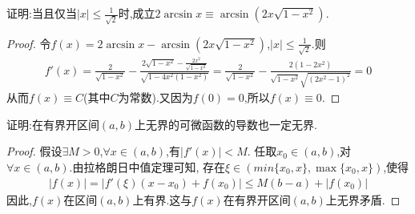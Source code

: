 \documentclass[lang=cn,newtx,10pt,scheme=chinese]{../Template/elegantbook}
\begin{document}
\begin{exercise}
    证明:当且仅当\(\vert x\vert\leqslant \frac{1}{\sqrt{2}}\)时,成立\(2\arcsin x\equiv\arcsin(2x\sqrt{1 - x^{2}})\).
    \begin{proof}
    令$f(x)=2\arcsin x-\arcsin(2x\sqrt{1 - x^{2}})$,\(\vert x\vert\leqslant \frac{1}{\sqrt{2}}\).则
    \begin{equation}
        \begin{split}
            f'\left( x \right) =\frac{2}{\sqrt{1-x^2}}-\frac{2\sqrt{1-x^2}-\frac{2x^2}{\sqrt{1-x^2}}}{\sqrt{1-4x^2\left( 1-x^2 \right)}}
            =\frac{2}{\sqrt{1-x^2}}-\frac{2\left( 1-2x^2 \right)}{\sqrt{1-x^2}\sqrt{\left( 2x^2-1 \right) ^2}}=0
        \end{split}
      \nonumber
    \end{equation}
    从而$f(x)\equiv C$(其中$C$为常数).又因为$f(0)=0$,所以$f(x)\equiv0$.
    
\end{proof}
\end{exercise}


\begin{exercise}
    证明:在有界开区间\((a,b)\)上无界的可微函数的导数也一定无界.
    \begin{proof}
        假设$\exists M>0$,$\forall x\in(a,b)$,有$|f'(x)|<M$.
        任取$x_0\in(a,b)$,对$\forall x\in(a,b)$.由拉格朗日中值定理可知,
        存在$\xi\in(min\{x_0,x\},\max\{x_0,x\})$,使得
        \begin{equation}
            \begin{split}
                |f(x)|=|f'(\xi )(x-x_0)+f(x_0)|\leqslant M\left( b-a \right) +|f(x_0)|
            \end{split}
            \nonumber
        \end{equation}
        因此,$f(x)$在区间$(a,b)$上有界.这与$f(x)$在有界开区间\((a,b)\)上无界矛盾.
    
\end{proof}
\end{exercise}
\end{document}
